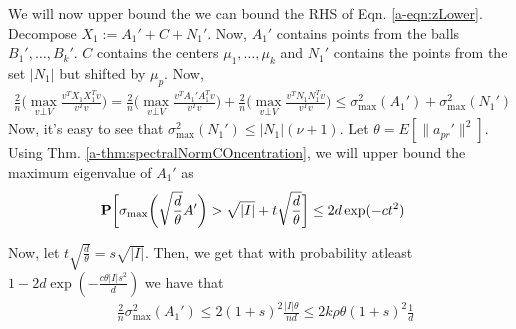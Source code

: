 
We will now upper bound the we can bound the RHS of Eqn. \ref{a-eqn:zLower}. Decompose $X_1 := A_1' + C + N_1'$. Now, $A_1'$ contains points from the balls $B_1', \ldots, B_k'$. $C$ contains the centers $\mu_1, \ldots, \mu_k$ and $N_1'$ contains the points from the set $|N_1|$ but shifted by $\mu_p$. Now,
\begin{align*}
\frac{2}{n}\Big(\max_{v\bot V} \frac{v^T X_1X_1^Tv}{v^Tv}\Big) = \frac{2}{n}\Big(\max_{v\bot V} \frac{v^T A_1'A_1^Tv}{v^Tv}\Big) + \frac{2}{n}\Big(\max_{v\bot V} \frac{v^T N_1N_1^Tv}{v^Tv}\Big) \le \sigma_{\max}^2(A_1') + \sigma_{\max}^2(N_1')
\end{align*}
Now, it's easy to see that $\sigma_{\max}^2(N_1') \le |N_1|(\nu+1)$. Let $\theta = E[\|a_{pr}'\|^2]$. Using Thm. \ref{a-thm:spectralNormCOncentration}, we will upper bound the maximum eigenvalue of $A_1'$ as 
\begin{align}
  &\mathbf P\bigg[\sigma_{\max}\bigg(\sqrt{\frac{d}{\theta}}A'\bigg) > \sqrt{|I|} + t\sqrt{\frac{d}{\theta}} \bigg] \le 2d\exp(-ct^2)
\end{align}

Now, let $t\sqrt{\frac{d}{\theta}} = s\sqrt{|I|}$. Then, we get that with probability atleast $1-2d\exp(-\frac{c\theta |I|s^2}{d})$ we have that 
\begin{align*}
  &\frac{2}{n}\sigma_{\max}^2(A_1') \le 2(1+s)^2\frac{|I|\theta}{nd} \le 2k\rho\theta (1+s)^2\frac{1}{d}
\end{align*}

